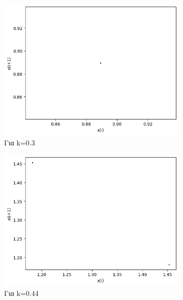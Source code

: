 \begin{figure}[h!]
	\centering
	\caption{Διαγράμματα της τιμής \(x_i\) με την τιμή \(x_{i+1}\) :}
	\begin{subfigure}[b]{0.25\textwidth}
		\centering
		\includegraphics[width=\textwidth]{LateX images/graphs q03/g3}
		\caption{Για k=0.3}
		\label{f:k15}
	\end{subfigure}
	\hfill
	\begin{subfigure}[b]{0.25\textwidth}
		\centering
		\includegraphics[width=\textwidth]{LateX images/graphs q03/g4}
		\caption{Για k=0.44}
		\label{f:k16}
	\end{subfigure}
	\hfill
	\begin{subfigure}[b]{0.25\textwidth}
		\centering

\end{subfigure}
\end{figure}
